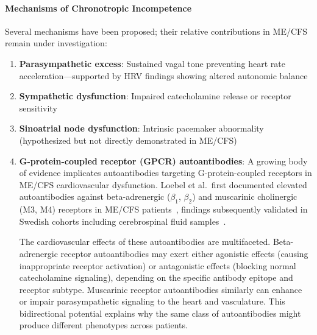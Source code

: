 \paragraph{Mechanisms of Chronotropic Incompetence}
Several mechanisms have been proposed; their relative contributions in ME/CFS remain under investigation:

\begin{enumerate}
    \item \textbf{Parasympathetic excess}: Sustained vagal tone preventing heart rate acceleration---supported by HRV findings showing altered autonomic balance~\cite{Newton2007autonomicDysfunction}
    \item \textbf{Sympathetic dysfunction}: Impaired catecholamine release or receptor sensitivity
    \item \textbf{Sinoatrial node dysfunction}: Intrinsic pacemaker abnormality (hypothesized but not directly demonstrated in ME/CFS)
    \item \textbf{G-protein-coupled receptor (GPCR) autoantibodies}: A growing body of evidence implicates autoantibodies targeting G-protein-coupled receptors in ME/CFS cardiovascular dysfunction. Loebel et al.\ first documented elevated autoantibodies against beta-adrenergic ($\beta_1$, $\beta_2$) and muscarinic cholinergic (M3, M4) receptors in ME/CFS patients~\cite{Loebel2016}, findings subsequently validated in Swedish cohorts including cerebrospinal fluid samples~\cite{Bynke2020}.

    The cardiovascular effects of these autoantibodies are multifaceted. Beta-adrenergic receptor autoantibodies may exert either agonistic effects (causing inappropriate receptor activation) or antagonistic effects (blocking normal catecholamine signaling), depending on the specific antibody epitope and receptor subtype. Muscarinic receptor autoantibodies similarly can enhance or impair parasympathetic signaling to the heart and vasculature. This bidirectional potential explains why the same class of autoantibodies might produce different phenotypes across patients.


\end{enumerate}
